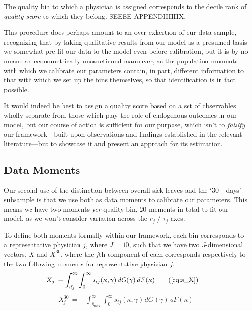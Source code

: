 \documentclass[../main.tex]{subfiles}
\begin{document}
The quality bin to which a physician is assigned corresponds to the decile rank of \textit{quality score} to which they belong. SEEEE APPENDIIIIIIX.

This procedure does perhaps amount to an over-exhertion of our data sample, recognizing that by taking qualitative results from our model as a presumed basis we somewhat pre-fit our data to the model even before calibration, but it is by no means an econometrically unsanctioned manouver, as the population moments with which we calibrate our parameters contain, in part, different information to that with which we set up the bins themselves, so that identification is in fact possible. 

It would indeed be best to assign a quality score based on a set of observables wholly separate from those which play the role of endogenous outcomes in our model, but our course of action is sufficient for our purpose, which isn't to \textit{falsify} our framework—built upon observations and findings established in the relevant literature—but to showcase it and present an approach for its estimation.

\subsection{Data Moments}

Our second use of the distinction between overall sick leaves and the `30+ days' subsample is that we use both as data moments to calibrate our parameters. This means we have two moments \textit{per} quality bin, 20 moments in total to fit our model, as we won't consider variation across the $r_j$ / $\tau_j$ axes.

To define both moments formally within our framework, each bin corresponds to a representative physician $j$, where $J = 10$, such that we have two $J$-dimensional vectors, $X$ and $X^{30}$, where the $j$th component of each corresponds respectively to the two following moments for representative physician $j$:
\begin{align}
    X_j \,=\, &  \int_{\bar{\kappa_j}}^{\infty} \int_{0}^{\infty}s_{ij}(\kappa, \gamma)  \,dG(\gamma) \,dF(\kappa) \tag{\ref{eq:s_X}}
\end{align}
\begin{align}
    X_j^{30} \,=\, & \int_{\bar{\kappa}_{\max}}^{\infty} \int_{0}^{\infty}s_{ij}(\kappa, \gamma)  \,dG(\gamma) \,dF(\kappa)
    \label{eq:X30}
\end{align}
\end{document}
